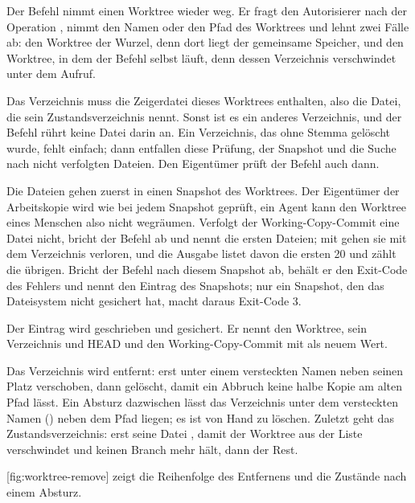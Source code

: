 Der Befehl  nimmt einen Worktree wieder weg.
Er fragt den Autorisierer nach der Operation , nimmt den Namen oder den
Pfad des Worktrees und lehnt zwei Fälle ab: den Worktree der Wurzel, denn dort liegt der
gemeinsame Speicher, und den Worktree, in dem der Befehl selbst läuft, denn dessen Verzeichnis
verschwindet unter dem Aufruf.

\startitemize[n]
\item Das Verzeichnis muss die Zeigerdatei dieses Worktrees enthalten, also die Datei, die sein
Zustandsverzeichnis nennt. Sonst ist es ein anderes Verzeichnis, und der Befehl rührt keine Datei
darin an. Ein Verzeichnis, das ohne Stemma gelöscht wurde, fehlt einfach; dann entfallen
diese Prüfung, der Snapshot und die Suche nach nicht verfolgten Dateien.
Den Eigentümer prüft der Befehl auch dann.
\item Die Dateien gehen zuerst in einen Snapshot des Worktrees. Der Eigentümer der Arbeitskopie
wird wie bei jedem Snapshot geprüft, ein Agent kann den Worktree eines Menschen also nicht
wegräumen. Verfolgt der Working-Copy-Commit eine Datei nicht, bricht der Befehl ab und nennt die
ersten Dateien; mit  gehen sie mit dem Verzeichnis verloren,
und die Ausgabe listet davon die ersten 20 und zählt die übrigen.
Bricht der Befehl nach diesem Snapshot ab, behält er den Exit-Code des Fehlers
und nennt den Eintrag des Snapshots;
nur ein Snapshot, den das Dateisystem nicht gesichert hat, macht daraus Exit-Code 3.
\item Der Eintrag  wird geschrieben und gesichert. Er nennt den Worktree,
sein Verzeichnis und HEAD und den Working-Copy-Commit mit \type{-} als neuem Wert.
\item Das Verzeichnis wird entfernt: erst unter einem versteckten Namen neben seinen Platz
verschoben, dann gelöscht, damit ein Abbruch keine halbe Kopie am alten Pfad lässt.
Ein Absturz dazwischen lässt das Verzeichnis unter dem versteckten Namen
() neben dem Pfad liegen; es ist von Hand zu löschen.
Zuletzt geht das Zustandsverzeichnis: erst seine Datei , damit der Worktree
aus der Liste verschwindet und keinen Branch mehr hält, dann der Rest.
\stopitemize

[fig:worktree-remove] zeigt die Reihenfolge des Entfernens und die Zustände
nach einem Absturz.

\startplacefigure[title={Reihenfolge von \type{worktree remove}, mit den Zuständen
    nach einem Absturz},
    reference=fig:worktree-remove,location=here]
\stopplacefigure

